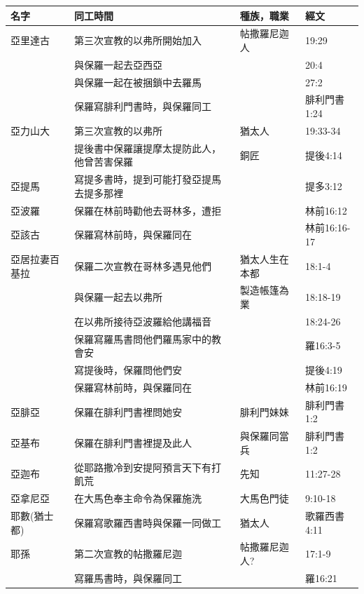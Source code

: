 \begin{table}[htbp]
  \centering
    \begin{tabular}{|l|l|l|l|}
    \toprule
   名字 & 同工時間  & 種族，職業 &   經文\\ 
          \midrule
 亞里達古&第三次宣教的以弗所開始加入& 帖撒羅尼迦人  & 19:29 \\
      &與保羅一起去亞西亞 &   &20:4  \\
      & 與保羅一起在被捆鎖中去羅馬&    &  27:2  \\
     &保羅寫腓利門書時，與保羅同工 & &腓利門書1:24\\ 
    \midrule 
 亞力山大&第三次宣教的以弗所&猶太人  & 19:33-34  \\
     &提後書中保羅讓提摩太提防此人，他曾苦害保羅&銅匠  & 提後4:14  \\
    \midrule

亞提馬&寫提多書時，提到可能打發亞提馬去提多那裡  & &提多3:12\\ \midrule
亞波羅&保羅在林前時勸他去哥林多，遭拒&& 林前16:12\\ \midrule 
亞該古&保羅寫林前時，與保羅同在 & &林前16:16-17\\ \midrule
亞居拉妻百基拉&保羅二次宣教在哥林多遇見他們 & 猶太人生在本都&18:1-4 \\
    &與保羅一起去以弗所 &製造帳篷為業 &18:18-19 \\ 
     &在以弗所接待亞波羅給他講福音 & &18:24-26\\   
    &保羅寫羅馬書問他們羅馬家中的教會安 &  &羅16:3-5 \\  
     &寫提後時，保羅問他們安  &  & 提後4:19\\ 
    &保羅寫林前時，與保羅同在 & &林前16:19\\ \midrule
亞腓亞& 保羅在腓利門書裡問她安 & 腓利門妹妹      &腓利門書1:2\\ \midrule
亞基布& 保羅在腓利門書裡提及此人 & 與保羅同當兵      &腓利門書1:2\\ \midrule
亞迦布& 從耶路撒冷到安提阿預言天下有打飢荒 & 先知     &11:27-28\\  \midrule  
亞拿尼亞 &在大馬色奉主命令為保羅施洗  & 大馬色門徒      &9:10-18\\  \midrule  
 
耶數(猶士都)& 保羅寫歌羅西書時與保羅一同做工&猶太人 &歌羅西書4:11  \\
 \midrule
耶孫&第二次宣教的帖撒羅尼迦 &帖撒羅尼迦人?  &17:1-9  \\  
    &寫羅馬書時，與保羅同工 &  & 羅16:21 \\   \midrule  


\end{tabular}
\end{table}
